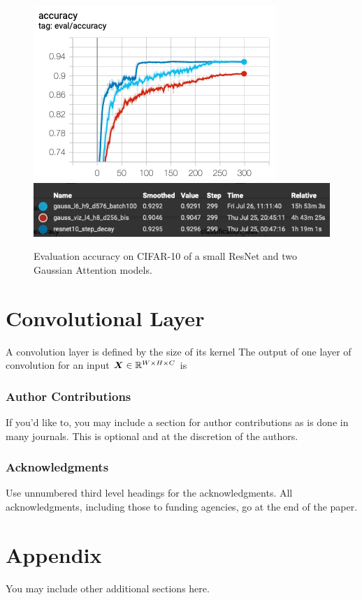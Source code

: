 \documentclass{article} %
\begin{document}
\begin{figure}[h]
  \includegraphics[width=.4\linewidth]{plots/eval_accuracy_plot.png}
  \hfill
  \includegraphics[width=.6\linewidth]{plots/eval_accuracy_legend.png}
  \caption{Evaluation accuracy on CIFAR-10 of a small ResNet and two Gaussian Attention models.}
\end{figure}





\section{Convolutional Layer}

A convolution layer is defined by the size of its kernel
The output of one layer of convolution for an input ${\bm{X}} \in \mathbb{R}^{W\times H \times C}$ is


\subsubsection*{Author Contributions}
If you'd like to, you may include  a section for author contributions as is done
in many journals. This is optional and at the discretion of the authors.

\subsubsection*{Acknowledgments}
Use unnumbered third level headings for the acknowledgments. All
acknowledgments, including those to funding agencies, go at the end of the paper.





\appendix
\section{Appendix}
You may include other additional sections here. 
\end{document}

